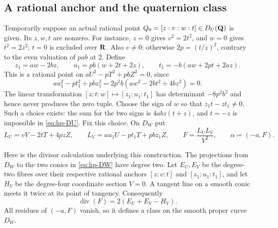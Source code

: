 \subsection{A rational anchor and the quaternion class}

Temporarily suppose an actual rational point
$Q_0=[z:v:w:t]\in D_U(\mathbf Q)$ is given.  Its $z,w,t$ are nonzero.
For instance, $z=0$ gives $v^2=2t^2$, and $w=0$ gives $t^2=2z^2$;
$t=0$ is excluded over $\mathbf R$.  Also $v\ne0$: otherwise
$2p=(t/z)^2$, contrary to the even valuation of $pab$ at $2$.
Define
\begin{equation}\label{eq:hp-anchor}
 z_1=aw-2bz,\qquad u_1=pb(w+2t+2z),\qquad
 t_1=-b(aw+2pt+2az).
\end{equation}
This is a rational point on $aU^2-pT^2+pbZ^2=0$, since
\[
 au_1^2-pt_1^2+pbz_1^2
 =2p^2b(aw^2-2bt^2+4bz^2)=0.
\]
The linear transformation $[z:t:w]\mapsto[z_1:u_1:t_1]$ has determinant
$-8p^2b^2$ and hence never produces the zero tuple.  Choose the sign of
$w$ so that $z_1t-zt_1\ne0$.  Such a choice exists: the sum for the two
signs is $4abz(t+z)$, and $t=-z$ is impossible in \eqref{eq:hp-DU}.
Fix this choice.  On $D_W$ put
\begin{equation}\label{eq:hp-polar}
 L_U=vV-2tT+4pzZ,\qquad
 L_V=au_1U-pt_1T+pbz_1Z,\qquad
 F=\frac{L_UL_V}{V^2},\qquad \alpha=(-a,F).
\end{equation}

Here is the divisor calculation underlying this construction.
The projections from $D_W$ to the two conics in \eqref{eq:hp-DW} have
degree two.  Let $E_U,E_V$ be the degree-two fibres over their respective
rational anchors $[z:v:t]$ and $[z_1:u_1:t_1]$, and let $H_V$ be the
degree-four coordinate section $V=0$.  A tangent line on a smooth
conic meets it twice at its point of tangency.  Consequently
\begin{equation}\label{eq:hp-divisor}
 \operatorname{div}(F)=2(E_U+E_V-H_V).
\end{equation}
All residues of $(-a,F)$ vanish, so it defines a class on the smooth
proper curve $D_W$.

